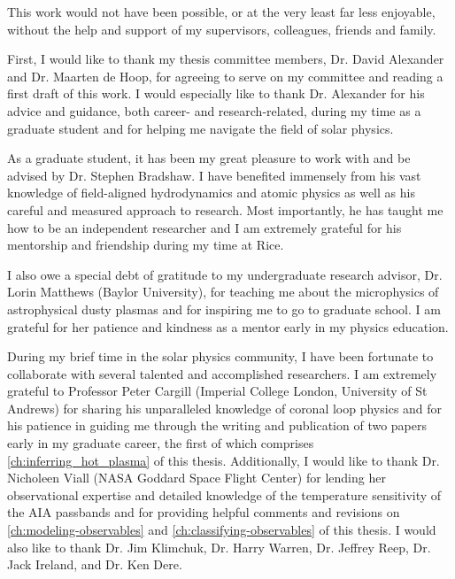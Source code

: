 \begin{acknowledgements}      
This work would not have been possible, or at the very least far less enjoyable, without the help and support of my supervisors, colleagues, friends and family. 

First, I would like to thank my thesis committee members, Dr. David Alexander and Dr. Maarten de Hoop, for agreeing to serve on my committee and reading a first draft of this work. I would especially like to thank Dr. Alexander for his advice and guidance, both career- and research-related, during my time as a graduate student and for helping me navigate the field of solar physics.

As a graduate student, it has been my great pleasure to work with and be advised by Dr. Stephen Bradshaw. I have benefited immensely from his vast knowledge of field-aligned hydrodynamics and atomic physics as well as his careful and measured approach to research. Most importantly, he has taught me how to be an independent researcher and I am extremely grateful for his mentorship and friendship during my time at Rice.

I also owe a special debt of gratitude to my undergraduate research advisor, Dr. Lorin Matthews (Baylor University), for teaching me about the microphysics of astrophysical dusty plasmas and for inspiring me to go to graduate school. I am grateful for her patience and kindness as a mentor early in my physics education.

During my brief time in the solar physics community, I have been fortunate to collaborate with several talented and accomplished researchers. I am extremely grateful to Professor Peter Cargill (Imperial College London, University of St Andrews) for sharing his unparalleled knowledge of coronal loop physics and for his patience in guiding me through the writing and publication of two papers early in my graduate career, the first of which comprises \autoref{ch:inferring_hot_plasma} of this thesis. Additionally, I would like to thank Dr. Nicholeen Viall (NASA Goddard Space Flight Center) for lending her observational expertise and detailed knowledge of the temperature sensitivity of the AIA passbands and for providing helpful comments and revisions on \autoref{ch:modeling-observables} and \autoref{ch:classifying-observables} of this thesis. I would also like to thank Dr. Jim Klimchuk, Dr. Harry Warren, Dr. Jeffrey Reep, Dr. Jack Ireland, and Dr. Ken Dere.


\end{acknowledgements}
